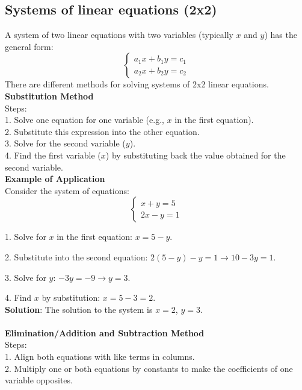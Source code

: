 \documentclass{article} %
\begin{document}
\subsection{Systems of linear equations (2x2)}
A system of two linear equations with two variables (typically $x$ and $y$) has the general form:
\[
\begin{cases}
a_1x + b_1y = c_1 \\
a_2x + b_2y = c_2
\end{cases}
\]
There are different methods for solving systems of 2x2 linear equations.\\
\textbf{Substitution Method}\\
Steps:\\
1. Solve one equation for one variable (e.g., $x$ in the first equation).\\

2. Substitute this expression into the other equation.\\

3. Solve for the second variable ($y$).\\

4. Find the first variable ($x$) by substituting back the value obtained for the second variable.\\

\textbf{Example of Application}\\

Consider the system of equations:
\[
\begin{cases} 
x + y = 5 \\ 
2x - y = 1 
\end{cases}
\]

1. Solve for $x$ in the first equation: $x = 5 - y$.

2. Substitute into the second equation: $2(5 - y) - y = 1 \rightarrow 10 - 3y = 1$.

3. Solve for $y$: $-3y = -9 \rightarrow y = 3$.

4. Find $x$ by substitution: $x = 5 - 3 = 2$.\\

\textbf{Solution}: The solution to the system is $x = 2$, $y = 3$.\\
\\
\textbf{Elimination/Addition and Subtraction Method}\\
Steps:\\
1. Align both equations with like terms in columns.\\

2. Multiply one or both equations by constants to make the coefficients of one variable opposites.\\
\end{document}
